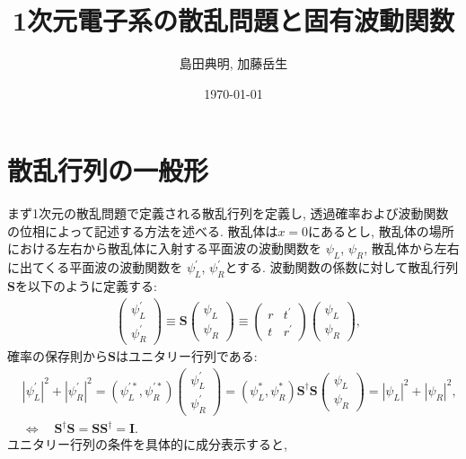 \documentclass[10pt,a4j]{jarticle}
\title{1次元電子系の散乱問題と固有波動関数}
\author{島田典明, 加藤岳生}
\date{\today}
\begin{document}
\maketitle

\section{散乱行列の一般形}

まず1次元の散乱問題で定義される散乱行列を定義し, 透過確率および波動関数の位相によって記述する方法を述べる. 
散乱体は$x=0$にあるとし, 散乱体の場所における左右から散乱体に入射する平面波の波動関数を
$\psi_{L}$, $\psi_{R}$, 散乱体から左右に出てくる平面波の波動関数を
$\psi_{L}^\prime$, $\psi_{R}^\prime$とする. 
波動関数の係数に対して散乱行列$\bm{S}$を以下のように定義する:
\begin{align}
& \left( \begin{array}{c} \psi_L^\prime \\ \psi^{\prime}_R \end{array} \right) 
\equiv \bm{S} \left( \begin{array}{c} \psi_L \\ \psi_R \end{array} \right) 
\equiv \left( \begin{array}{cc} r & t^{\prime} \\ t & r^{\prime} \end{array} \right)
\left( \begin{array}{c} \psi_L \\ \psi_R \end{array} \right), 
\label{eq:s}
\end{align}
確率の保存則から$\bm{S}$はユニタリー行列である:
\begin{align}
& |\psi_L^\prime|^2 + |\psi^{\prime}_R|^2 = ( \psi^{\prime*}_L , \psi^{\prime*}_R )
\left( \begin{array}{c} \psi_L^\prime \\ \psi^{\prime}_R \end{array} \right) 
= (\psi_L^* ,\psi_R^* ) \bm{S}^{\dagger} \bm{S} 
\left( \begin{array}{c} \psi_L \\ \psi_R \end{array} \right)
= |\psi_L|^2 + |\psi_R|^2, \\
&\Longleftrightarrow \quad \bm{S}^{\dagger} \bm{S} = \bm{S} \bm{S}^{\dagger}  = \bm{I}. \label{eq:suni}
\end{align} 
ユニタリー行列の条件を具体的に成分表示すると, 
\end{document}
